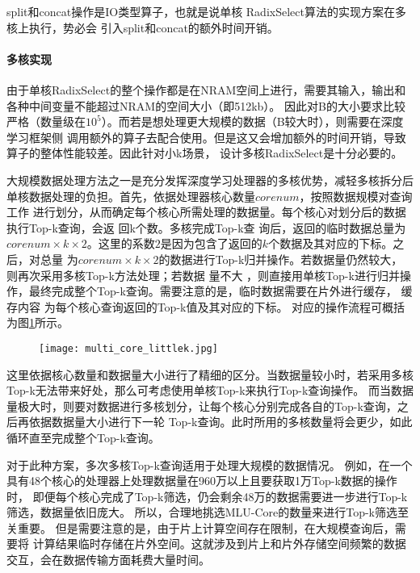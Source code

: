 split和concat操作是IO类型算子，也就是说单核 RadixSelect算法的实现方案在多核上执行，势必会
引入split和concat的额外时间开销。


\paragraph{多核实现}
由于单核RadixSelect的整个操作都是在NRAM空间上进行，需要其输入，输出和各种中间变量不能超过NRAM的空间大小（即512kb）。
因此对B的大小要求比较严格（数量级在$10^5$）。而若是想处理更大规模的数据（B较大时），则需要在深度学习框架侧
调用额外的算子去配合使用。但是这又会增加额外的时间开销，导致算子的整体性能较差。因此针对小k场景，
设计多核RadixSelect是十分必要的。

大规模数据处理方法之一是充分发挥深度学习处理器的多核优势，减轻多核拆分后单核数据处理的负担。首先，依据处理器核心数量\(corenum\)，按照数据规模对查询工作
进行划分，从而确定每个核心所需处理的数据量。每个核心对划分后的数据执行Top-k查询，会返
回k个数。多核完成Top-k查
询后，返回的临时数据总量为\(corenum×k×2\)。这里的系数\(2\)是因为包含了返回的\(k\)个数据及其对应的下标。之后，对总量
为\(corenum×k×2\)的数据进行Top-k归并操作。若数据量仍然较大，则再次采用多核Top-k方法处理；若数据
量不大
，则直接用单核Top-k进行归并操作，最终完成整个Top-k查询。需要注意的是，临时数据需要在片外进行缓存，
缓存内容
为每个核心查询返回的Top-k值及其对应的下标。
对应的操作流程可概括为图\ref{fig:multi_core_littlek}所示。
\begin{figure}[ht]
    \centering
    \texttt{[image: multi\_core\_littlek.jpg]}
    \caption{}
    \label{fig:multi_core_littlek}
\end{figure}
    
这里依据核心数量和数据量大小进行了精细的区分。当数据量较小时，若采用多核Top-k无法带来好处，那么可考虑使用单核Top-k来执行Top-k查询操作。
而当数据量极大时，则要对数据进行多核划分，让每个核心分别完成各自的Top-k查询，之后再依据数据量大小进行下一轮
Top-k查询。此时所用的多核数量将会更少，如此循环直至完成整个Top-k查询。

对于此种方案，多次多核Top-k查询适用于处理大规模的数据情况。
例如，在一个具有48个核心的处理器上处理数据量在960万以上且要获取1万Top-k数据的操作时，
即便每个核心完成了Top-k筛选，仍会剩余48万的数据需要进一步进行Top-k筛选，数据量依旧庞大。
所以，合理地挑选MLU-Core的数量来进行Top-k筛选至关重要。
但是需要注意的是，由于片上计算空间存在限制，在大规模查询后，需要将
计算结果临时存储在片外空间。这就涉及到片上和片外存储空间频繁的数据交互，会在数据传输方面耗费大量时间。

